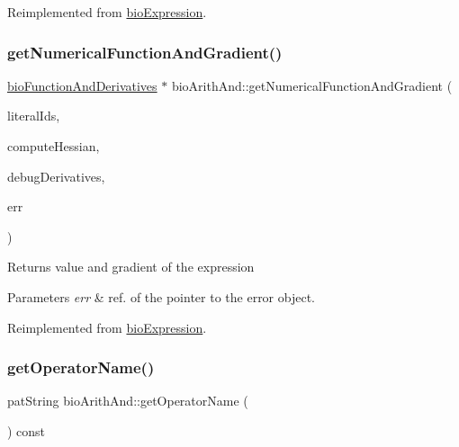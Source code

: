 Reimplemented from \hyperlink{classbio_expression_a3e4b4dca58dbbc6f0e411b30eb3f60b4}{bio\+Expression}.

\mbox{\label{classbio_arith_and_af6745a5c2aca1539519d14c9e1ce5f5e}} 
\subsubsection{\texorpdfstring{get\+Numerical\+Function\+And\+Gradient()}{getNumericalFunctionAndGradient()}}
{\footnotesize\ttfamily \hyperlink{classbio_function_and_derivatives}{bio\+Function\+And\+Derivatives} $\ast$ bio\+Arith\+And\+::get\+Numerical\+Function\+And\+Gradient (\begin{DoxyParamCaption}\item[{vector$<$ pat\+U\+Long $>$}]{literal\+Ids,  }\item[{pat\+Boolean}]{compute\+Hessian,  }\item[{pat\+Boolean}]{debug\+Derivatives,  }\item[{pat\+Error $\ast$\&}]{err }\end{DoxyParamCaption})\hspace{0.3cm}{\ttfamily [virtual]}}

\begin{DoxyReturn}{Returns}
value and gradient of the expression 
\end{DoxyReturn}

\begin{DoxyParams}{Parameters}
{\em err} & ref. of the pointer to the error object. \\
\hline
\end{DoxyParams}


Reimplemented from \hyperlink{classbio_expression_a91c81ce80c9e972c913b10f5f3c1ed13}{bio\+Expression}.

\mbox{\label{classbio_arith_and_accefac4c7d08a3698bd3691e19641bfb}} 
\subsubsection{\texorpdfstring{get\+Operator\+Name()}{getOperatorName()}}
{\footnotesize\ttfamily pat\+String bio\+Arith\+And\+::get\+Operator\+Name (\begin{DoxyParamCaption}{ }\end{DoxyParamCaption}) const\hspace{0.3cm}{\ttfamily [virtual]}}


